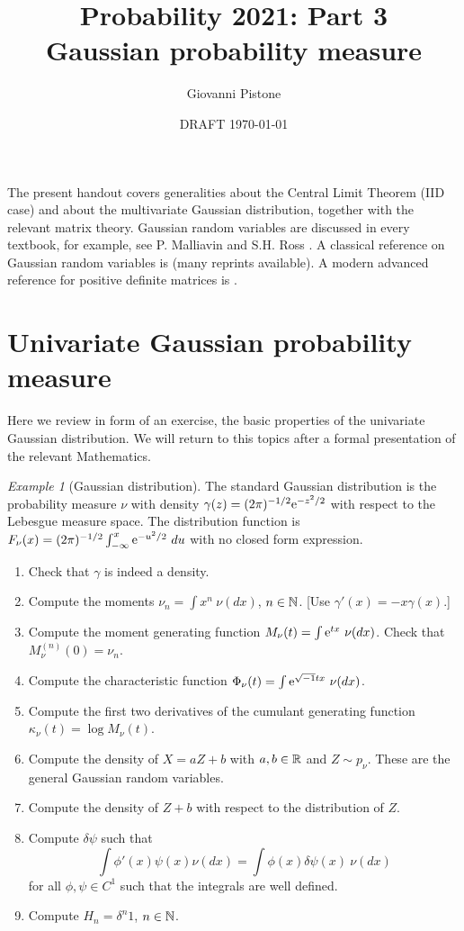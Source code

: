 \documentclass[12pt,a4paper]{amsart}
\title{Probability 2021: Part 3 \\
Gaussian probability measure}
\author[G. Pistone]{Giovanni Pistone}
\date{DRAFT \today}
\theoremstyle{plain}%
\theoremstyle{definition}
\theoremstyle{remark}
\newtheorem{example}{Example}
\begin{document}
\maketitle
\tableofcontents

The present handout covers generalities about the Central Limit Theorem (IID
case) and  about the multivariate Gaussian distribution, together with the relevant matrix theory. Gaussian random
variables are discussed in every textbook, for example, see P. Malliavin
\cite[Ch.~V]{malliavin:1995} and  S.H. Ross \cite[Ch.~10]{ross:2010introduction10}. A classical reference on Gaussian random
variables is \cite{anderson:2003-3ed} (many reprints available). A
modern advanced reference for positive definite matrices is
\cite{bhatia:2007}.

\section{Univariate Gaussian probability measure}
\label{sec:introduction}

Here we review in form of an exercise, the basic properties of the
univariate Gaussian distribution. We will return to this topics after
a formal presentation of the relevant Mathematics.

\begin{example}[Gaussian distribution]
The standard Gaussian distribution is the probability measure $\nu$
with density $\gamma(z) = (2\pi)^{-1/2} \mathrm{e}^{-z^2/2}$ with respect
to the Lebesgue measure space. The distribution function is $F_\nu(x) = (2\pi)^{-1/2} \int_{-\infty}^x \mathrm{e}^{-u^2/2} \ du$ with no closed form expression.
\begin{enumerate}
\item Check that $\gamma$ is indeed a density.
\item Compute the moments $\nu_n = \int x^n \ \nu(dx)$, $n \in \mathbb{N}$. [Use $\gamma'(x) = -x \gamma(x)$.]
\item Compute the moment generating function $M_\nu(t) = \int \mathrm{e} ^{tx} \ \nu(dx)$. Check that $M^{(n)}_\nu(0) = \nu_n$.
\item Compute the characteristic function $\Phi_\nu(t) = \int \euler ^{\sqrt{-1} tx} \ \nu(dx)$.
\item Compute the first two derivatives of the cumulant generating function $\kappa_\nu(t) = \log M_\nu(t)$.
\item Compute the density of $X = aZ + b$ with $a,b \in \mathbb{R}$ and $Z \sim p_\nu$. These are the general Gaussian random variables. 
\item Compute the density of $Z + b$ with respect to the distribution of $Z$.
\item Compute $\delta \psi$ such that
  \begin{equation*}
    \int \phi'(x) \psi(x)  \nu(dx) = \int \phi(x) \delta \psi(x) \ \nu(dx)
  \end{equation*}
for all $\phi,\psi \in C^1$ such that the integrals are well defined.
\item Compute $H_n = \delta^n 1$, $n \in \mathbb{N}$.
\end{enumerate}  
\end{example}
\end{document}
